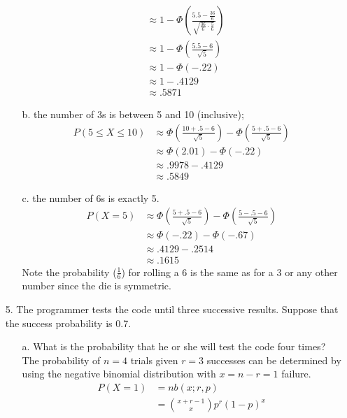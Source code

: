 \documentclass[letterpaper,12pt]{article}
\begin{document}
\begin{enumerate}
\begin{enumerate}
\begin{align*}
          &\approx 1 - \Phi\left(\frac{5.5 - \frac{36}{6}}{\sqrt{\frac{36}{6} \cdot \frac{5}{6}}}\right) \\
          &\approx 1 - \Phi\left(\frac{5.5 - 6}{\sqrt{5}}\right) \\
          &\approx 1 - \Phi(-.22) \\
          &\approx 1 - .4129 \\
          &\approx .5871
        \end{align*}
      \item[b.]
        the number of 3s is between 5 and 10 (inclusive);
        \begin{align*}
          P(5 \le X \le 10) &\approx \Phi\left(\frac{10 + .5 - 6}{\sqrt{5}}\right) - \Phi\left(\frac{5 + .5 - 6}{\sqrt{5}}\right) \\
          &\approx \Phi(2.01) - \Phi(-.22) \\
          &\approx .9978 - .4129 \\
          &\approx .5849
        \end{align*}
      \item[c.]
        the number of 6s is exactly 5.
        \begin{align*}
          P(X = 5) &\approx \Phi\left(\frac{5 + .5 - 6}{\sqrt{5}}\right) - \Phi\left(\frac{5 - .5 - 6}{\sqrt{5}}\right) \\
          &\approx \Phi(-.22)  - \Phi(-.67) \\
          &\approx .4129 - .2514 \\
          &\approx .1615
        \end{align*}
        Note the probability ($\frac{1}{6}$) for rolling a 6 is the same as for a 3 or any other number since the die is symmetric.
    \end{enumerate}
  \item[5.]
    The programmer tests the code until three successive results. Suppose that the success probability is 0.7.
    \begin{enumerate}
      \item[a.]
        What is the probability that he or she will test the code four times?
        \\
        The probability of $n = 4$ trials given $r = 3$ successes can be determined by using the negative binomial distribution with $x = n - r = 1$ failure.
        \begin{align*}
          P(X = 1) &= nb(x; r, p) \\
          &= \binom{x + r - 1}{x} p^r (1 - p)^x \\

\end{align*}
\end{enumerate}
\end{enumerate}
\end{document}

